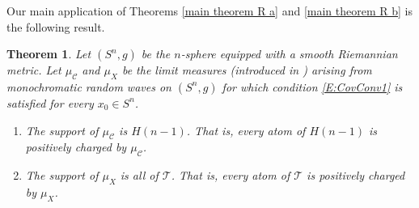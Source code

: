 \documentclass[11pt,reqno]{amsart}
\newtheorem{theorem}{Theorem}
\theoremstyle{definition}
\begin{document}
%

Our main application of Theorems \ref{main theorem R a} and  \ref{main theorem R b} is the following result.

\begin{theorem}\label{main theorem}Let $(S^n,g)$ be the $n$-sphere equipped with a smooth Riemannian metric. Let $\mu_{\mathcal C}$ and  $\mu_X$ be the limit  measures (introduced in \cite{SW}) arising from monochromatic random waves on $(S^n,g)$ for which  condition \eqref{E:CovConv1} is satisfied for every $x_0 \in S^n$. 
\begin{enumerate}
\item [(i)] 
The support of $\mu_{\mathcal C}$ is  $H(n-1)$. That is, every atom of $H(n-1)$ is positively charged by $\mu_{\mathcal C}$.\\
\item [(ii)] The support of $\mu_X$ is all of $\mathcal T$. That is, every atom of $\mathcal T$ is positively charged by $\mu_X$.
\end{enumerate}
\end{theorem} 
\end{document}
